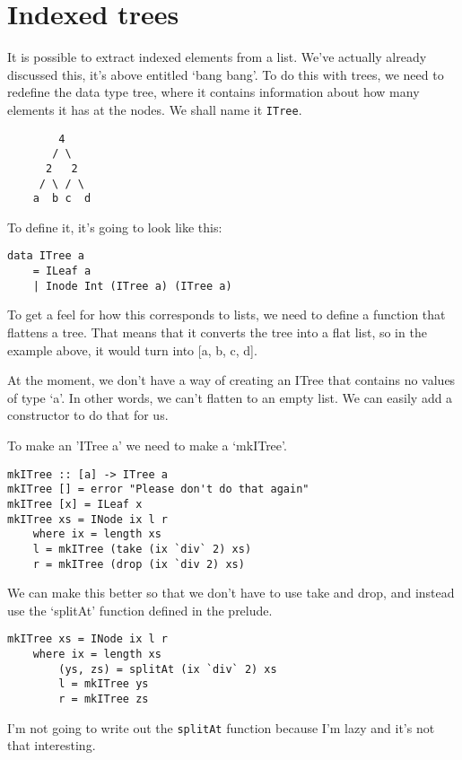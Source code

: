 \documentclass[11pt,a4paper,titlepage]{scrartcl}
\begin{document}
\section{Indexed trees}%
\label{sec:index}

It is possible to extract indexed elements from a list. We've actually
already discussed this, it's above entitled `bang bang'. To do this with
trees, we need to redefine the data type tree, where it contains
information about how many elements it has at the nodes. We shall name it
\lstinline|ITree|.

\begin{lstlisting}
        4
       / \
      2   2
     / \ / \
    a  b c  d
\end{lstlisting}

To define it, it's going to look like this:
\begin{lstlisting}
data ITree a
    = ILeaf a
    | Inode Int (ITree a) (ITree a)
\end{lstlisting}
To get a feel for how this corresponds to lists, we need to define a
function that flattens a tree. That means that it converts the tree into a
flat list, so in the example above, it would turn into [a, b, c, d].

At the moment, we don't have a way of creating an ITree that contains no
values of type `a'. In other words, we can't flatten to an empty list. We
can easily add a constructor to do that for us. 

To make an 'ITree a' we need to make a `mkITree'.

\begin{lstlisting}
mkITree :: [a] -> ITree a
mkITree [] = error "Please don't do that again"
mkITree [x] = ILeaf x
mkITree xs = INode ix l r
    where ix = length xs
    l = mkITree (take (ix `div` 2) xs)
    r = mkITree (drop (ix `div 2) xs)
\end{lstlisting}

We can make this better so that we don't have to use take and drop, and
instead use the `splitAt' function defined in the prelude.

\begin{lstlisting}
mkITree xs = INode ix l r
    where ix = length xs
        (ys, zs) = splitAt (ix `div` 2) xs
        l = mkITree ys
        r = mkITree zs
\end{lstlisting}

I'm not going to write out the \lstinline|splitAt| function because I'm
lazy and it's not that interesting.
\end{document}
